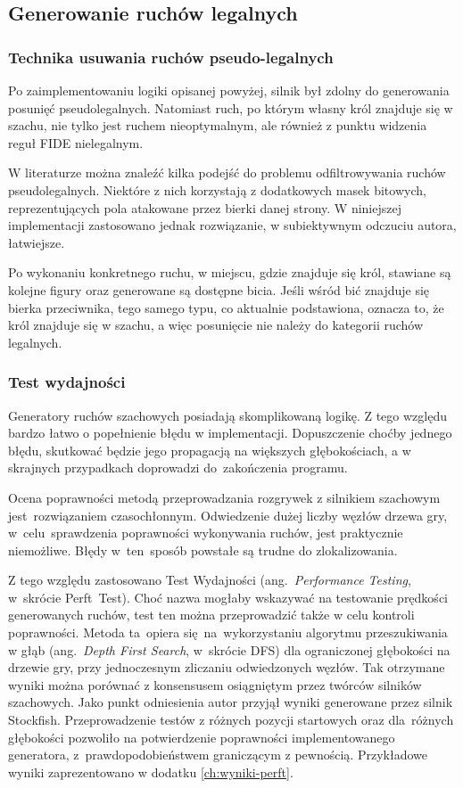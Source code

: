 \subsection{Generowanie ruchów legalnych}
\label{subsec:generowanie-ruchow-legalnych}

\subsubsection{Technika usuwania ruchów pseudo-legalnych}

Po zaimplementowaniu logiki opisanej powyżej, silnik był zdolny do generowania posunięć pseudolegalnych.
Natomiast ruch, po którym własny król znajduje się w szachu, nie tylko jest ruchem nieoptymalnym, ale również z punktu widzenia reguł FIDE nielegalnym.

W literaturze można znaleźć kilka podejść do problemu odfiltrowywania ruchów pseudolegalnych.
Niektóre z nich korzystają z dodatkowych masek bitowych, reprezentujących pola atakowane przez bierki danej strony.
W niniejszej implementacji zastosowano jednak rozwiązanie, w subiektywnym odczuciu autora, łatwiejsze.

Po wykonaniu konkretnego ruchu, w miejscu, gdzie znajduje się król, stawiane są kolejne figury oraz generowane są dostępne bicia.
Jeśli wśród bić znajduje się bierka przeciwnika, tego samego typu, co aktualnie podstawiona, oznacza to, że król znajduje się w szachu, a więc posunięcie nie należy do kategorii ruchów legalnych.

\subsubsection{Test wydajności}

Generatory ruchów szachowych posiadają skomplikowaną logikę.
Z tego względu bardzo łatwo o popełnienie błędu w implementacji.
Dopuszczenie choćby jednego błędu, skutkować będzie jego propagacją na większych głębokościach, a w skrajnych przypadkach doprowadzi do~zakończenia programu.

Ocena poprawności metodą przeprowadzania rozgrywek z silnikiem szachowym jest~rozwiązaniem czasochłonnym.
Odwiedzenie dużej liczby węzłów drzewa gry, w~celu~sprawdzenia poprawności wykonywania ruchów, jest praktycznie niemożliwe.
Błędy w~ten~sposób powstałe są trudne do zlokalizowania.

Z tego względu zastosowano Test Wydajności (ang.~\emph{Performance Testing}, w~skrócie Perft~Test).
Choć nazwa mogłaby wskazywać na testowanie prędkości generowanych ruchów, test ten można przeprowadzić także w celu kontroli poprawności.
Metoda ta~opiera się~na~wykorzystaniu algorytmu przeszukiwania w głąb (ang.~\emph{Depth First Search}, w~skrócie DFS) dla ograniczonej głębokości na drzewie gry, przy jednoczesnym zliczaniu odwiedzonych węzłów.
Tak otrzymane wyniki można porównać z konsensusem osiągniętym przez twórców silników szachowych.
Jako punkt odniesienia autor przyjął wyniki generowane przez silnik Stockfish.
Przeprowadzenie testów z różnych pozycji startowych oraz dla~różnych głębokości pozwoliło na potwierdzenie poprawności implementowanego generatora, z~prawdopodobieństwem graniczącym z pewnością.
Przykładowe wyniki zaprezentowano w dodatku \ref{ch:wyniki-perft}.

